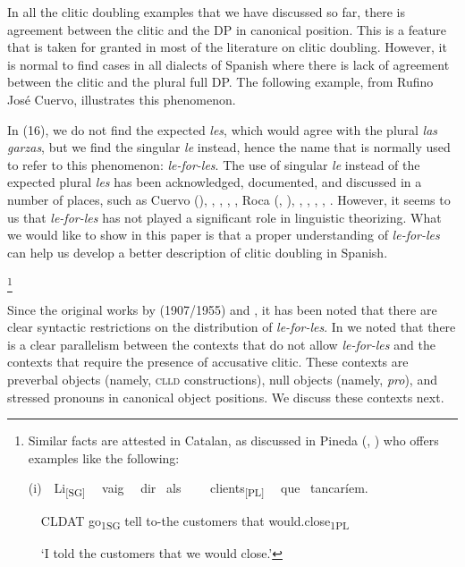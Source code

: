 \documentclass[output=paper,colorlinks,citecolor=brown,
]{langscibook}
\begin{document}
In all the clitic doubling examples that we have discussed so far, there is agreement between the clitic and the DP in canonical position. This is a feature that is taken for granted in most of the literature on clitic doubling. However, it is normal to find cases in all dialects of Spanish where there is lack of agreement between the clitic and the plural full DP. The following example, from Rufino José Cuervo, illustrates this phenomenon.




In (16), we do not find the expected \textit{les}, which would agree with the plural \textit{las garzas}, but we find the singular \textit{le} instead, hence the name that is normally used to refer to this phenomenon: \textit{le-for-les}. The use of singular \textit{le} instead of the expected plural \textit{les} has been acknowledged, documented, and discussed in a number of places, such as Cuervo (\citeyear{cuervo1955}), \citet[107--120]{casares1918}, \citet{sturgis1927}, \citet{rinni1988}, \citet{demello1992}, Roca (\citeyear{roca1992}, \citeyear{roca1996}), \citet{soriano1999pronombre}, \citet{boeckx2004}, \citet{huerta2005}, \citet{rae2009}, \citet{ausin2017}. However, it seems to us that \textit{le-for-les} has not played a significant role in linguistic theorizing. What we would like to show in this paper is that a proper understanding of \textit{le-for-les} can help us develop a better description of clitic doubling in Spanish.

\footnote{\textrm{ Similar facts are attested in Catalan, as discussed in Pineda (\citeyear{pineda2018}, \citeyear{pineda2019}) who offers examples like the following: }\par \textrm{(i)\ \ Li}\textrm{\textsubscript{[SG]}}\textrm{ \ \ vaig \ \ dir \ als \ \ \ \ clients}\textrm{\textsubscript{[PL]}}\textrm{ \ \ que \ tancaríem. }\par \textrm{\ \ CLDAT go}\textrm{\textsubscript{1SG}}\textrm{ tell to-the customers that would.close}\textrm{\textsubscript{1PL}}\par \textrm{\ \ ‘I told the customers that we would close.’}
}

Since the original works by \citeauthor{cuervo1955} (1907/1955) and \citet{casares1918}, it has been noted that there are clear syntactic restrictions on the distribution of \textit{le-for-les}. In \citet{ausin2017} we noted that there is a clear parallelism between the contexts that do not allow \textit{le-for-les} and the contexts that require the presence of accusative clitic. These contexts are preverbal objects (namely, \textsc{clld} constructions), null objects (namely, \textit{pro}), and stressed pronouns in canonical object positions. We discuss these contexts next.
\end{document}
